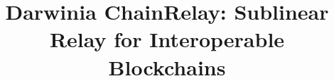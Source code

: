\documentclass[10pt,conference]{inatel}
\begin{document}


  \title{Darwinia ChainRelay: Sublinear Relay for Interoperable Blockchains}


\maketitle









\end{document}
